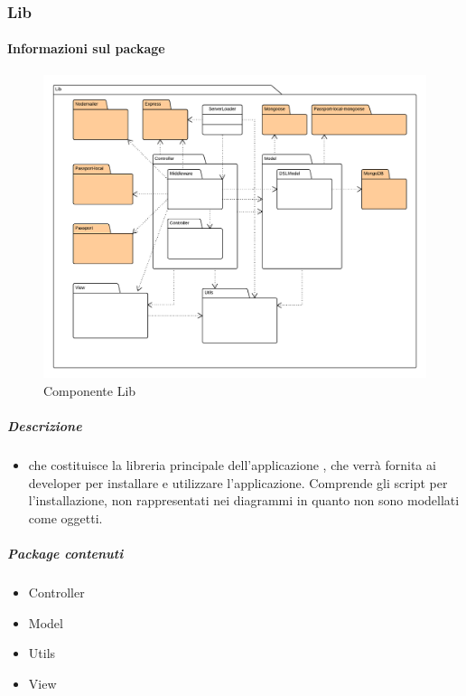   \subsubsection{Lib}
  \paragraph{Informazioni sul package} 
    \begin{figure}[H] 
      \begin{center} 
        \includegraphics[width=\textwidth]{uml/package/Back-end::Lib.png}  
        \caption{Componente Lib}
      \end{center}  
    \end{figure} 
  \subparagraph{Descrizione} 
    \begin{itemize}
    \item[]  che costituisce la libreria principale dell’applicazione , che verrà fornita ai
developer per installare e utilizzare l’applicazione. Comprende gli script per l’installazione,
non rappresentati nei diagrammi in quanto non sono modellati come oggetti.

    \end{itemize} 
    \subparagraph{Package contenuti} 
    \begin{itemize}
        \item Controller
        \item Model
        \item Utils
        \item View
    \end{itemize}
